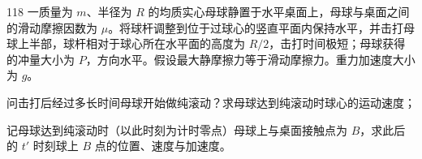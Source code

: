 \begin{problem}[2020第37届全国中学生物理竞赛复赛][母球纯滚动动力学分析]{118}
    一质量为 $m$、半径为 $R$ 的均质实心母球静置于水平桌面上，母球与桌面之间的滑动摩擦因数为 $\mu$。将球杆调整到位于过球心的竖直平面内保持水平，并击打母球上半部，球杆相对于球心所在水平面的高度为 $R/2$，击打时间极短；母球获得的冲量大小为 $P$，方向水平。假设最大静摩擦力等于滑动摩擦力。重力加速度大小为 $g$。
    \begin{subproblem}
        问击打后经过多长时间母球开始做纯滚动？求母球达到纯滚动时球心的运动速度；
    \end{subproblem}
    \begin{subproblem}
        记母球达到纯滚动时（以此时刻为计时零点）母球上与桌面接触点为 $B$，求此后的 $t'$ 时刻球上 $B$ 点的位置、速度与加速度。
    \end{subproblem}
\end{problem}